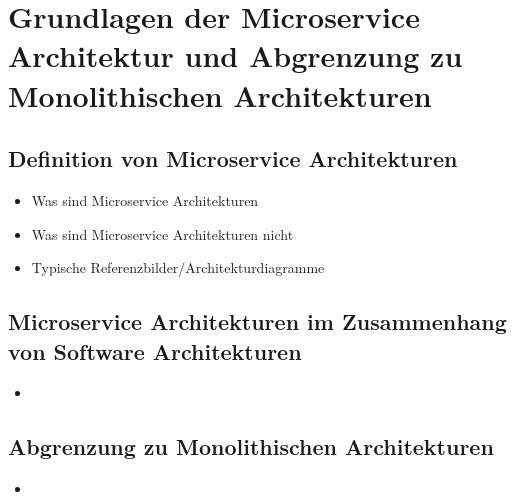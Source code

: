 \newpage
\section{Grundlagen der Microservice Architektur und Abgrenzung zu
Monolithischen Architekturen} \label{grundlagen}

\subsection{Definition von Microservice Architekturen}

\begin{itemize}
  \item Was sind Microservice Architekturen
  \item Was sind Microservice Architekturen nicht
  \item Typische Referenzbilder/Architekturdiagramme
\end{itemize}

\subsection{Microservice Architekturen im Zusammenhang von Software Architekturen}

\begin{itemize}
  \item
\end{itemize}

\subsection{Abgrenzung zu Monolithischen Architekturen}

\begin{itemize}
  \item
\end{itemize}
